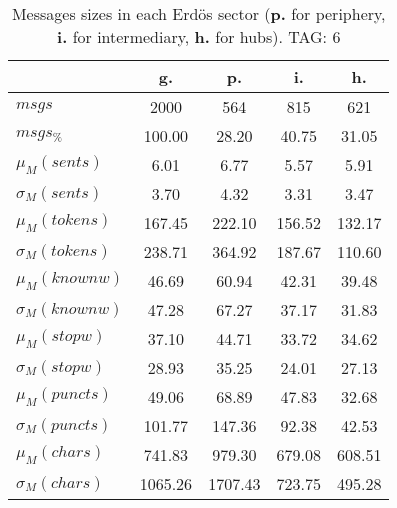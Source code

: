 \begin{table}[h!]
\begin{center}
\begin{tabular}{| l | c | c | c | c |}\hline
 & g. & p. & i. & h. \\\hline
$msgs$ & 2000  & 564  & 815  & 621 \\\hline
$msgs_{\%}$ & 100.00  & 28.20  & 40.75  & 31.05 \\\hline
$\mu_M(sents)$ & 6.01  & 6.77  & 5.57  & 5.91 \\\hline
$\sigma_M(sents)$ & 3.70  & 4.32  & 3.31  & 3.47 \\\hline
$\mu_M(tokens)$ & 167.45  & 222.10  & 156.52  & 132.17 \\\hline
$\sigma_M(tokens)$ & 238.71  & 364.92  & 187.67  & 110.60 \\\hline
$\mu_M(knownw)$ & 46.69  & 60.94  & 42.31  & 39.48 \\\hline
$\sigma_M(knownw)$ & 47.28  & 67.27  & 37.17  & 31.83 \\\hline
$\mu_M(stopw)$ & 37.10  & 44.71  & 33.72  & 34.62 \\\hline
$\sigma_M(stopw)$ & 28.93  & 35.25  & 24.01  & 27.13 \\\hline
$\mu_M(puncts)$ & 49.06  & 68.89  & 47.83  & 32.68 \\\hline
$\sigma_M(puncts)$ & 101.77  & 147.36  & 92.38  & 42.53 \\\hline
$\mu_M(chars)$ & 741.83  & 979.30  & 679.08  & 608.51 \\\hline
$\sigma_M(chars)$ & 1065.26  & 1707.43  & 723.75  & 495.28 \\\hline
\end{tabular}
\caption{Messages sizes in each Erd\"os sector ({{\bf p.}} for periphery, {{\bf i.}} for intermediary, {{\bf h.}} for hubs). TAG: 6}
\end{center}
\end{table}
